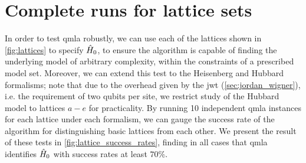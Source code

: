\section{Complete  \glspl{run} for lattice sets}
In order to test \gls{qmla} robustly, 
    we can use each of the lattices shown in \cref{fig:lattices} to specify $\hat{H}_0$, 
    to ensure the algorithm is capable of finding the underlying model of arbitrary complexity, 
    within the constraints of a prescribed model set\footnotemark. 
Moreover, we can extend this test to the Heisenberg and Hubbard formalisms; 
    note that due to the overhead given by the \gls{jwt} (\cref{sec:jordan_wigner}), i.e. the requirement of two qubits per site, 
    we restrict study of the Hubbard model to lattices $a-e$ for practicality. 
By running 10 independent \gls{qmla} \glspl{instance} for each lattice under each formalism,
    we can gauge the success rate of the algorithm for distinguishing basic lattices from each other. 
We present the result of these tests in \cref{fig:lattice_success_rates},   
    finding in all cases that \gls{qmla} identifies $\hat{H}_0$ with success rates at least $70\%$. 
\par 


